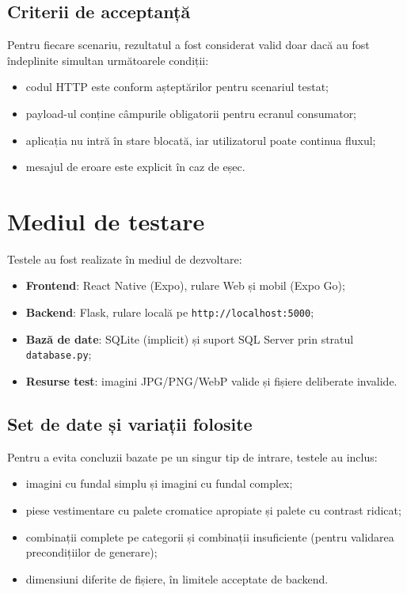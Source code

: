 \subsection{Criterii de acceptanță}
Pentru fiecare scenariu, rezultatul a fost considerat valid doar dacă au fost îndeplinite simultan următoarele condiții:
\begin{itemize}
    \item codul HTTP este conform așteptărilor pentru scenariul testat;
    \item payload-ul conține câmpurile obligatorii pentru ecranul consumator;
    \item aplicația nu intră în stare blocată, iar utilizatorul poate continua fluxul;
    \item mesajul de eroare este explicit în caz de eșec.
\end{itemize}

\section{Mediul de testare}
Testele au fost realizate în mediul de dezvoltare:
\begin{itemize}
    \item \textbf{Frontend}: React Native (Expo), rulare Web și mobil (Expo Go);
    \item \textbf{Backend}: Flask, rulare locală pe \texttt{http://localhost:5000};
    \item \textbf{Bază de date}: SQLite (implicit) și suport SQL Server prin stratul \texttt{database.py};
    \item \textbf{Resurse test}: imagini JPG/PNG/WebP valide și fișiere deliberate invalide.
\end{itemize}

\subsection{Set de date și variații folosite}
Pentru a evita concluzii bazate pe un singur tip de intrare, testele au inclus:
\begin{itemize}
    \item imagini cu fundal simplu și imagini cu fundal complex;
    \item piese vestimentare cu palete cromatice apropiate și palete cu contrast ridicat;
    \item combinații complete pe categorii și combinații insuficiente (pentru validarea precondițiilor de generare);
    \item dimensiuni diferite de fișiere, în limitele acceptate de backend.
\end{itemize}

